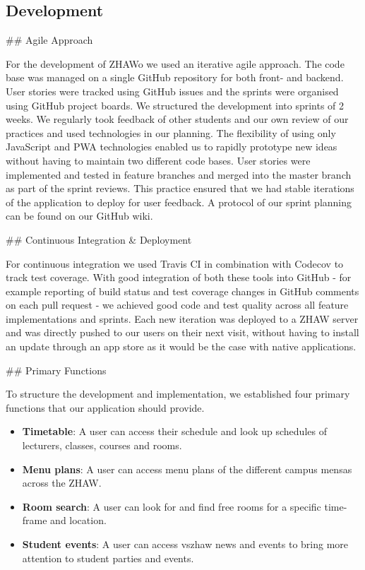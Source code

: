 \begin{markdown}
\section{Development} \label{development}

## Agile Approach

For the development of ZHAWo we used an iterative agile approach. The code base was managed on a single GitHub repository \cite{OurGithub} for both front- and backend. User stories were tracked using GitHub issues and the sprints were organised using GitHub project boards. We structured the development into sprints of 2 weeks. We regularly took feedback of other students and our own review of our practices and used technologies in our planning. The flexibility of using only JavaScript and PWA technologies enabled us to rapidly prototype new ideas without having to maintain two different code bases.
User stories were implemented and tested in feature branches and merged into the master branch as part of the sprint reviews. This practice ensured that we had stable iterations of the application to deploy for user feedback. A protocol of our sprint planning can be found on our GitHub wiki.

## Continuous Integration \& Deployment

For continuous integration we used Travis CI \cite{Travis} in combination with Codecov \cite{Codecov} to track test coverage. With good integration of both these tools into GitHub - for example reporting of build status and test coverage changes in GitHub comments on each pull request - we achieved good code and test quality across all feature implementations and sprints.
Each new iteration was deployed to a ZHAW server \cite{OurHost} and was directly pushed to our users on their next visit, without having to install an update through an app store as it would be the case with native applications.

## Primary Functions

To structure the development and implementation, we established four primary functions that our application should provide.

\begin{itemize}
  \item \textbf{Timetable}: A user can access their schedule and look up schedules of lecturers, classes, courses and rooms.
  \item \textbf{Menu plans}: A user can access menu plans of the different campus mensas across the ZHAW.
  \item \textbf{Room search}: A user can look for and find free rooms for a specific time-frame and location.
  \item \textbf{Student events}: A user can access vszhaw news and events to bring more attention to student parties and events.
\end{itemize}


\end{markdown}
